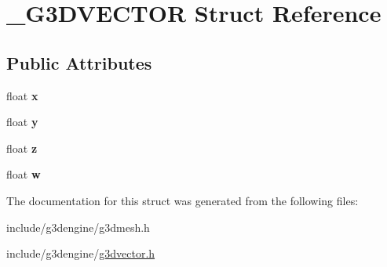 \hypertarget{struct__G3DVECTOR}{}\section{\+\_\+\+G3\+D\+V\+E\+C\+T\+OR Struct Reference}
\label{struct__G3DVECTOR}
\subsection*{Public Attributes}
\begin{DoxyCompactItemize}
\item 
\mbox{\label{struct__G3DVECTOR_a7b3adb2448c0cf55ff5ae71ae313f1df}} 
float {\bfseries x}
\item 
\mbox{\label{struct__G3DVECTOR_aaf54d41aa60f062fbfa61851f6b5ac38}} 
float {\bfseries y}
\item 
\mbox{\label{struct__G3DVECTOR_a8d5da44f3f49ee6d688ff432bd76f9b6}} 
float {\bfseries z}
\item 
\mbox{\label{struct__G3DVECTOR_a01cd4d224eb4c9b21ca60cd1b24b6204}} 
float {\bfseries w}
\end{DoxyCompactItemize}


The documentation for this struct was generated from the following files\+:\begin{DoxyCompactItemize}
\item 
include/g3dengine/g3dmesh.\+h\item 
include/g3dengine/\hyperlink{g3dvector_8h}{g3dvector.\+h}\end{DoxyCompactItemize}
